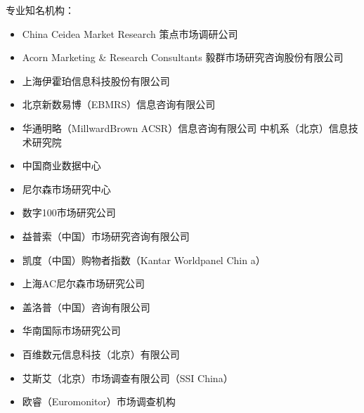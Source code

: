 \documentclass[letterpaper,10pt,english]{sphinxmanual}
\begin{document}
专业知名机构：
%
\begin{footnote}[507]\sphinxAtStartFootnote
{}
%
\end{footnote}
\begin{itemize}
\item {} 
China Ceidea Market Research 策点市场调研公司

\item {} 
Acorn Marketing \& Research Consultants 毅群市场研究咨询股份有限公司

\item {} 
上海伊霍珀信息科技股份有限公司

\item {} 
北京新数易博（EBMRS）信息咨询有限公司

\item {} 
华通明略（MillwardBrown ACSR）信息咨询有限公司
中机系（北京）信息技术研究院

\item {} 
中国商业数据中心

\item {} 
尼尔森市场研究中心

\item {} 
数字100市场研究公司

\item {} 
益普索（中国）市场研究咨询有限公司

\item {} 
凯度（中国）购物者指数（Kantar Worldpanel Chin\sphinxhyphen{} a）

\item {} 
上海AC尼尔森市场研究公司

\item {} 
盖洛普（中国）咨询有限公司

\item {} 
华南国际市场研究公司

\item {} 
百维数元信息科技（北京）有限公司

\item {} 
艾斯艾（北京）市场调查有限公司（SSI China）

\item {} 
欧睿（Euromonitor）市场调查机构

\end{itemize}
\end{document}
